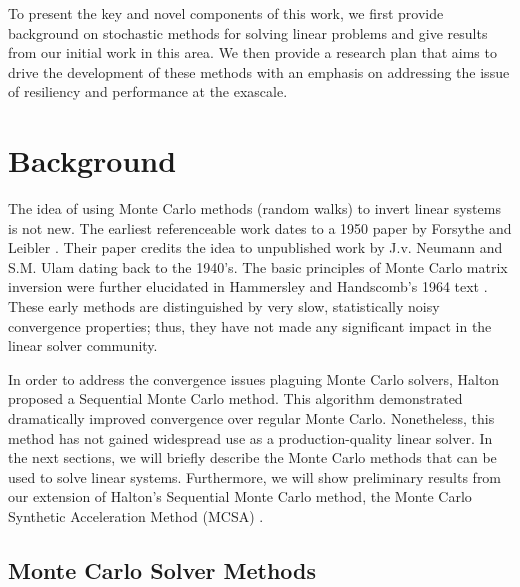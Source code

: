 To present the key and novel components of this work, we first provide
background on stochastic methods for solving linear problems and give results
from our initial work in this area. We then provide a research plan that aims
to drive the development of these methods with an emphasis on addressing the
issue of resiliency and performance at the exascale.

\section{Background}
\label{sec:background}

The idea of using Monte Carlo methods (random walks) to invert linear systems
is not new.  The earliest referenceable work dates to a 1950 paper by Forsythe
and Leibler \cite{forsythe}.  Their paper credits the idea to unpublished work
by J.v. Neumann and S.M. Ulam dating back to the 1940's.  The basic principles
of Monte Carlo matrix inversion were further elucidated in Hammersley and
Handscomb's 1964 text \cite{hammersley_1964}.  These early methods are
distinguished by very slow, statistically noisy convergence properties; thus,
they have not made any significant impact in the linear solver community.

In order to address the convergence issues plaguing Monte Carlo solvers,
Halton \cite{halton_1962,halton_1994} proposed a Sequential Monte Carlo
method.  This algorithm demonstrated dramatically improved convergence over
regular Monte Carlo.  Nonetheless, this method has not gained widespread use
as a production-quality linear solver.  In the next sections, we will briefly
describe the Monte Carlo methods that can be used to solve linear systems.
Furthermore, we will show preliminary results from our extension of Halton's
Sequential Monte Carlo method, the Monte Carlo Synthetic Acceleration Method
(MCSA) \cite{mc2009}.


\subsection{Monte Carlo Solver Methods}
\label{sec:monte-carlo-solver}

